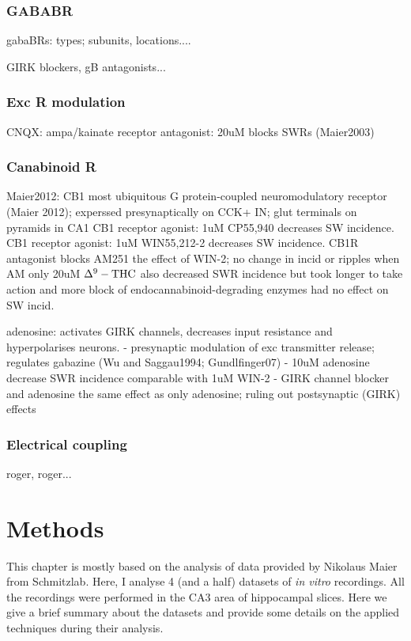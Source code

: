     \subsubsection{GABABR}
      gabaBRs: types; subunits, locations....

      GIRK blockers, gB antagonists...

    \subsubsection{Exc R modulation}
      CNQX: ampa/kainate receptor antagonist: 20uM blocks SWRs (Maier2003)

    \subsubsection{Canabinoid R}
      Maier2012:
          CB1 most ubiquitous G protein-coupled neuromodulatory receptor (Maier 2012); experssed presynaptically on CCK+ IN; glut terminals on pyramids in CA1
      CB1 receptor agonist: 1uM CP55,940 decreases SW incidence.
      CB1 receptor agonist: 1uM WIN55,212-2 decreases SW incidence.
      CB1R antagonist blocks AM251 the effect of WIN-2; no change in incid or ripples when AM only
      20uM $\Delta^9 \rm -THC$ also decreased SWR incidence but took longer to take action and more
      block of endocannabinoid-degrading enzymes had no effect on SW incid.

      adenosine: activates GIRK channels, decreases input resistance and hyperpolarises neurons.
        - presynaptic modulation of exc transmitter release; regulates gabazine (Wu and Saggau1994; Gundlfinger07)
        - 10uM adenosine decrease SWR incidence comparable with 1uM WIN-2
        - GIRK channel blocker and adenosine the same effect as only adenosine; ruling out postsynaptic (GIRK) effects

    \subsubsection{Electrical coupling}
      roger, roger...
      

\section{Methods}
  
  This chapter is mostly based on the analysis of data provided by Nikolaus
  Maier from Schmitzlab. Here, I analyse 4 (and a half) datasets of {\it in vitro}
  recordings. All the recordings were performed in the CA3 area of hippocampal
  slices. Here we give a brief summary about the datasets and provide some
  details on the applied techniques during their analysis.

